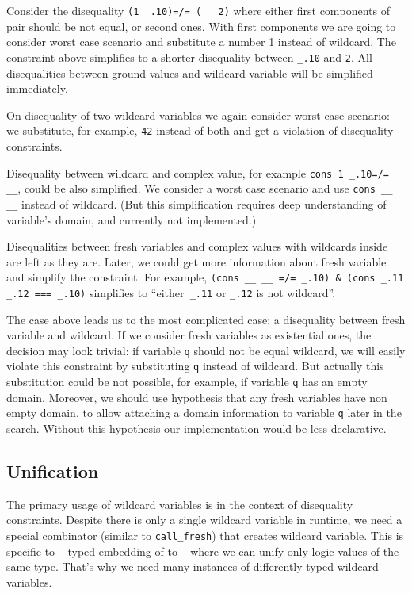 Consider the disequality \lstinline|(1 _.10)=/= (__ 2)| where either first components of pair should be not equal, or second ones. With first components we are going to consider worst case scenario and substitute a number 1 instead of wildcard. The constraint above simplifies to a shorter disequality between  \lstinline|_.10| and \lstinline|2|. All disequalities between ground values and wildcard variable will be simplified immediately.

On disequality of two wildcard variables we again consider worst case scenario: we substitute, for example, \lstinline|42| instead of both and get a violation of disequality constraints.

Disequality between wildcard and complex value, for example  \lstinline|cons 1 _.10=/= __|, could be also simplified. We consider a worst case scenario and use \lstinline|cons __ __| instead of wildcard. (But this simplification requires deep understanding of variable's domain, and currently not implemented.)

Disequalities between fresh variables and complex values with wildcards inside are left as they are. Later, we could get more information  about fresh variable and simplify the constraint. For example,
 \lstinline|(cons __ __ =/= _.10) & (cons _.11 _.12 === _.10)| simplifies to ``either\lstinline| _.11|  or \lstinline|_.12| is not wildcard''.

The case above leads us to the most complicated case: a disequality between fresh variable and wildcard. If we consider fresh variables as existential ones, the decision may look trivial: if variable \lstinline|q| should not be equal wildcard, we will easily violate this constraint by substituting \lstinline|q| instead of wildcard. But actually this substitution could be not possible, for example, if variable \lstinline|q| has an empty domain. Moreover, we should use hypothesis that any fresh variables have non empty domain, to allow attaching a domain information to variable \lstinline|q| later in the search. Without this hypothesis our \miniKanren{} implementation would be less declarative.



\subsection{Unification}
The primary usage of wildcard variables is in the context of disequality constraints.
Despite there is only a single wildcard variable in runtime, we  need a special combinator (similar to \lstinline|call_fresh|) that creates wildcard variable.
This is specific to \OCanren{} -- typed embedding of \miniKanren{} to \OCaml{} -- where we can unify only logic values of the same type. That's why we need many instances of differently typed wildcard variables.

